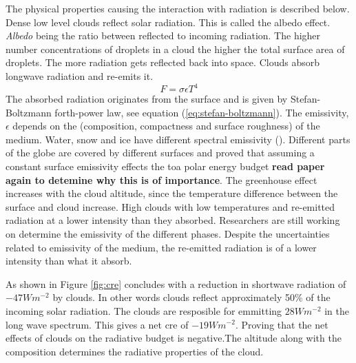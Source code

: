The physical properties causing the interaction with radiation is described below. Dense low level clouds reflect solar radiation. This is called the albedo effect. \textit{Albedo} being the ratio between reflected to incoming radiation. The higher number concentrations of droplets in a cloud the higher the total surface area of droplets. The more radiation gets reflected back into space. Clouds absorb longwave radiation and re-emits it. 
\begin{equation} \label{eq:stefan-boltzmann}
    F = \sigma \epsilon T ^4
\end{equation}
The absorbed radiation originates from the surface and is given by Stefan-Boltzmann forth-power law, see equation (\ref{eq:stefan-boltzmann}). The emissivity, $\epsilon$ depends on the (composition, compactness and surface roughness) of the medium. Water, snow and ice have different spectral emissivity (\cite{Huang2018ImprovedClimate}). Different parts of the globe are covered by different surfaces and \citeauthor{Huang2016AnSimulations} proved that assuming a constant surface emissivity effects the \acrfull{toa} polar energy budget \textbf{read paper again to detemine why this is of importance}. The greenhouse effect increases with the cloud altitude, since the temperature difference between the surface and cloud increase. High clouds with low temperatures and  re-emitted radiation at a lower intensity than they absorbed. Researchers are still working on determine the emissivity of the different phases. Despite the uncertainties related to emissivity of the medium, the re-emitted radiation is of a lower intensity than what it absorb.



As shown in Figure \ref{fig:cre} \citeauthor{Wild2019TheModels} concludes with a reduction in shortwave radiation of $-47Wm^{-2}$ by clouds. In other words clouds reflect approximately 50\% of the incoming solar radiation. The clouds are resposible for emmitting $28Wm^{-2}$ in the long wave spectrum. This gives a net \acrshort{cre} of $-19Wm^{-2}$. Proving that the net effects of clouds on the radiative budget is negative.The altitude along with the composition determines the radiative properties of the cloud. 




